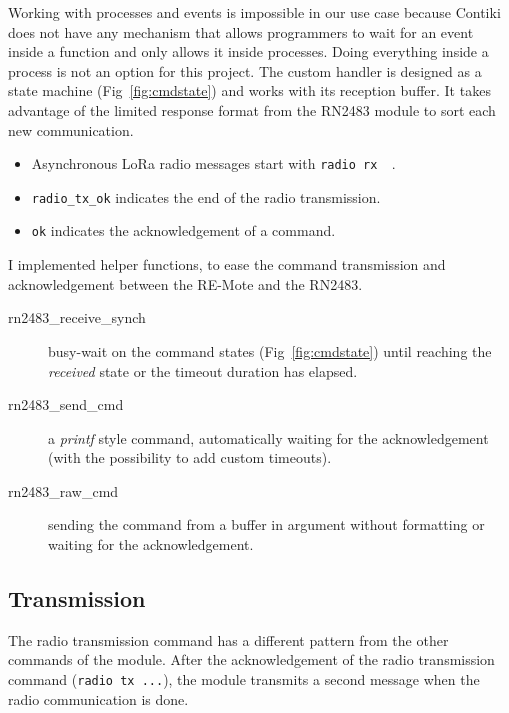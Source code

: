 Working with processes and events is impossible in our use case because Contiki 
does not have any mechanism that allows programmers to wait for an event inside a 
function and only allows it inside processes.
Doing everything inside a process is not an option for this project.
The custom handler is designed as a state machine (Fig~\ref{fig:cmdstate}) and 
works with its reception buffer. It takes advantage of the limited response 
format from the RN2483 module to sort each new communication.

\begin{itemize}
  \item Asynchronous LoRa radio messages start with \lstinline{radio rx  }.
  \item \lstinline{radio_tx_ok} indicates the end of the radio transmission. 
  \item \lstinline{ok} indicates the acknowledgement of a command.
\end{itemize}


I implemented helper functions, to ease the command transmission and
acknowledgement between the RE-Mote and the RN2483.

\begin{description}
  \item[rn2483\_receive\_synch] busy-wait on the command states
    (Fig~\ref{fig:cmdstate}) until reaching the \emph{received} state 
    or the timeout duration has elapsed.
  \item[rn2483\_send\_cmd] a \emph{printf} style command, automatically 
    waiting for the acknowledgement (with the possibility to add custom timeouts).
  \item[rn2483\_raw\_cmd] sending the command from a buffer in argument
    without formatting or waiting for the acknowledgement.
\end{description}



\subsection{Transmission}

The radio transmission command has a different pattern from the other commands 
of the module. 
After the acknowledgement of the radio transmission command (\lstinline{radio tx ...}),
the module transmits a second message when the radio communication is done.

